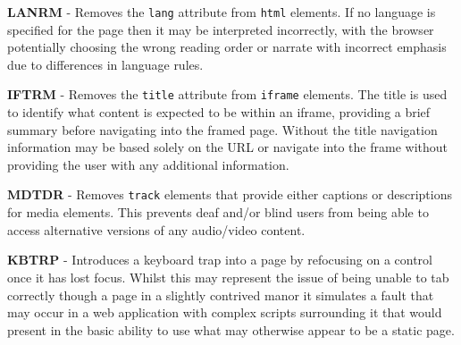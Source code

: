\textbf{LANRM} - Removes the \texttt{lang} attribute from \texttt{html} elements. If no language is specified for the page then it may be interpreted incorrectly, with the browser potentially choosing the wrong reading order or narrate with incorrect emphasis due to differences in language rules.

\textbf{IFTRM} - Removes the \texttt{title} attribute from \texttt{iframe} elements. The title is used to identify what content is expected to be within an iframe, providing a brief summary before navigating into the framed page. Without the title navigation information may be based solely on the URL or navigate into the frame without providing the user with any additional information.

\textbf{MDTDR} - Removes \texttt{track} elements that provide either captions or descriptions for media elements. This prevents deaf and/or blind users from being able to access alternative versions of any audio/video content.

\textbf{KBTRP} - Introduces a keyboard trap into a page by refocusing on a control once it has lost focus. Whilst this may represent the issue of being unable to tab correctly though a page in a slightly contrived manor it simulates a fault that may occur in a web application with complex scripts surrounding it that would present in the basic ability to use what may otherwise appear to be a static page.

